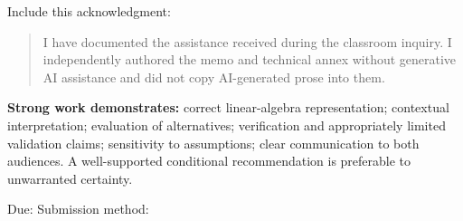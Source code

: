 \documentclass[10pt,letterpaper]{article}
\begin{document}
Include this acknowledgment:
\begin{quote}
I have documented the assistance received during the classroom inquiry. I independently authored the memo and technical annex without generative AI assistance and did not copy AI-generated prose into them.
\end{quote}
\textbf{Strong work demonstrates:} correct linear-algebra representation; contextual interpretation; evaluation of alternatives; verification and appropriately limited validation claims; sensitivity to assumptions; clear communication to both audiences. A well-supported conditional recommendation is preferable to unwarranted certainty.

Due: \underline{\hspace{1.5in}}\quad Submission method: \underline{\hspace{2in}}
\end{document}
